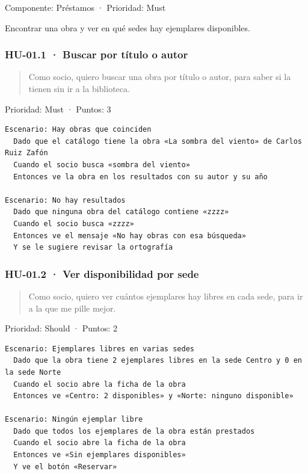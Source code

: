 \documentclass[11pt,a4paper]{article}
\begin{document}
Componente: Préstamos · Prioridad: Must

Encontrar una obra y ver en qué sedes hay ejemplares disponibles.

\subsubsection*{HU-01.1 · Buscar por título o autor}

\begin{quote}
Como socio, quiero buscar una obra por título o autor, para saber si la tienen sin ir a la biblioteca.
\end{quote}

Prioridad: Must · Puntos: 3

\begin{Verbatim}[breaklines,fontsize=\small,frame=single,framerule=0.4pt,rulecolor=\color{black!25}]
Escenario: Hay obras que coinciden
  Dado que el catálogo tiene la obra «La sombra del viento» de Carlos Ruiz Zafón
  Cuando el socio busca «sombra del viento»
  Entonces ve la obra en los resultados con su autor y su año

Escenario: No hay resultados
  Dado que ninguna obra del catálogo contiene «zzzz»
  Cuando el socio busca «zzzz»
  Entonces ve el mensaje «No hay obras con esa búsqueda»
  Y se le sugiere revisar la ortografía
\end{Verbatim}

\subsubsection*{HU-01.2 · Ver disponibilidad por sede}

\begin{quote}
Como socio, quiero ver cuántos ejemplares hay libres en cada sede, para ir a la que me pille mejor.
\end{quote}

Prioridad: Should · Puntos: 2

\begin{Verbatim}[breaklines,fontsize=\small,frame=single,framerule=0.4pt,rulecolor=\color{black!25}]
Escenario: Ejemplares libres en varias sedes
  Dado que la obra tiene 2 ejemplares libres en la sede Centro y 0 en la sede Norte
  Cuando el socio abre la ficha de la obra
  Entonces ve «Centro: 2 disponibles» y «Norte: ninguno disponible»

Escenario: Ningún ejemplar libre
  Dado que todos los ejemplares de la obra están prestados
  Cuando el socio abre la ficha de la obra
  Entonces ve «Sin ejemplares disponibles»
  Y ve el botón «Reservar»
\end{Verbatim}
\end{document}

